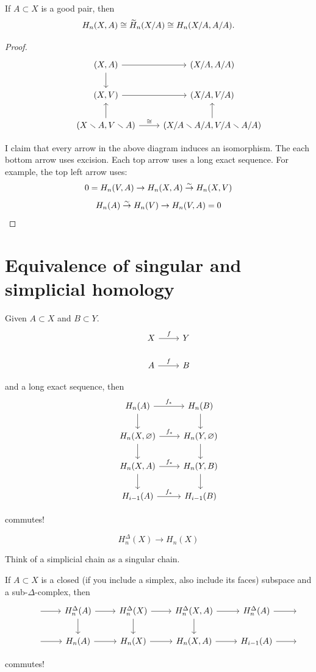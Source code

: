 \documentclass[11pt,leqno,oneside]{amsart}
\numberwithin{thm}{section}
\newcommand{\minus}{\smallsetminus}
\renewcommand{\null}{\varnothing}
\newcommand{\homl}[1][n]{H_{#1}}
\newcommand{\rhoml}[1][n]{\widetilde{H}_{#1}}
\newcommand{\dhoml}[1][n]{\homl^\Delta}
\begin{document}
\begin{thm}
  If $A \subset X$ is a good pair, then $$\homl(X, A) \isom \rhoml(X/A) \isom \homl(X/A, A/A).$$
\end{thm}
\begin{proof}
  $$\begin{tikzcd}
    &(X, A) \arrow[d] \arrow[r] &(X/A, A/A) \\
    &(X, V) \arrow[r] &(X/A, V/A) \\
    &(X \minus A, V \minus A) \arrow[u] \arrow[r, "\isom"] &(X/A \minus A/A, V/A \minus A/A) \arrow[u]
  \end{tikzcd}$$

  I claim that every arrow in the above diagram induces an isomorphism.  The each bottom arrow uses excision.  Each top arrow uses a long exact sequence.  For example, the top left arrow uses:
  $$0 = \homl(V, A) \to \homl(X, A) \isomto \homl(X, V)$$
  $$\homl(A) \isomto \homl(V) \to \homl(V, A) = 0$$
\end{proof}

\section{Equivalence of singular and simplicial homology}

\begin{thm}
  Given $A \subset X$ and $B \subset Y$.
  $$\begin{tikzcd}
    &X \arrow[r, "f"] &Y \\
    &A \arrow[r, "f"] &B
  \end{tikzcd}$$

  and a long exact sequence, then
  $$\begin{tikzcd}
    &\homl(A) \arrow[d] \arrow[r, "f_*"] &\homl(B) \arrow[d] \\
    &\homl(X, \null) \arrow[d] \arrow[r, "f_*"] &\homl(Y, \null) \arrow[d] \\
    &\homl(X, A) \arrow[d] \arrow[r, "f_*"] &\homl(Y, B) \arrow[d] \\
    &\homl[i-1](A) \arrow[r, "f_*"] &\homl[i-1](B)
  \end{tikzcd}$$

  commutes!
\end{thm}

$$\dhoml(X) \to \homl(X)$$

Think of a simplicial chain as a singular chain.

\begin{thm}
  If $A \subset X$ is a closed (if you include a simplex, also include its faces) subspace and a sub-$\Delta$-complex, then
  $$\begin{tikzcd}
    &\, \arrow[r] &\dhoml(A) \arrow[d] \arrow[r] &\dhoml(X) \arrow[d] \arrow[r] &\dhoml(X, A) \arrow[d] \arrow[r] &\dhoml[i-1](A) \arrow[r] &\, \\
    &\, \arrow[r] &\homl(A) \arrow[r] &\homl(X) \arrow[r] &\homl(X, A) \arrow[r] &\homl[i-1](A) \arrow[r] &\,
  \end{tikzcd}$$

  commutes!
\end{thm}
\end{document}
